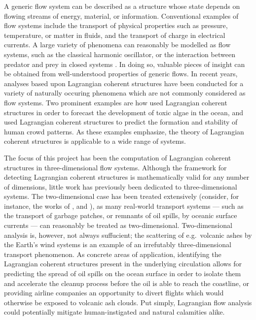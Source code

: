 A generic flow system can be described as a structure whose state depends on
flowing streams of energy, material, or information. Conventional examples of
flow systems include the transport of physical properties such as pressure,
temperature, or matter in fluids, and the transport of charge in electrical
currents. A large variety of phenomena can reasonably be modelled as flow
systems, such as the classical harmonic oscillator, or the interaction between
predator and prey in closed systems
\parencite[parts I--II]{strogatz2014nonlinear}. In doing so, valuable pieces
of insight can be obtained from well-understood properties of generic flows.
In recent years, analyses based upon Lagrangian coherent structures have been
conducted for a variety of naturally occuring phenomena which are not
commonly considered as flow systems. Two prominent examples are how
\textcite{olascoaga2008tracing} used Lagrangian coherent structures in order
to forecast the development of toxic algae in the ocean, and
\textcite{ali2007lagrangian} used Lagrangian coherent structures to predict
the formation and stability of human crowd patterns. As these examples
emphasize, the theory of Lagrangian coherent structures is applicable to a
wide range of systems.

The focus of this project has been the computation of Lagrangian coherent
structures in three-dimensional flow systems. Although the framework for
detecting Lagrangian coherent structures is mathematically valid for any number
of dimensions, little work has previously been dedicated to three-dimensional
systems. The two-dimensional case has been treated extensively (consider, for
instance, the works of \textcite{haller2000lagrangian},
\textcite{farazmand2012computing} and \textcite{onu2015lcstool}), as many
real-world transport systems --- such as the transport of garbage patches, or
remnants of oil spills, by oceanic surface currents --- can reasonably be
treated as two-dimensional. Two-dimensional analysis is, however, not always
suffucient; the scattering of e.g.\ volcanic ashes by the Earth's wind systems
is an example of an irrefutably three-dimensional transport phenomenon.
As concrete areas of application, identifying the Lagrangian coherent
structures present in the underlying circulation allows for predicting the
spread of oil spills on the ocean surface in order to isolate them and
accelerate the cleanup process before the oil is able to reach the
coastline, or providing airline companies an opportunity to divert flights
which would otherwise be exposed to volcanic ash clouds. Put simply, Lagrangian
flow analysis could potentially mitigate human-instigated and natural
calamities alike.

